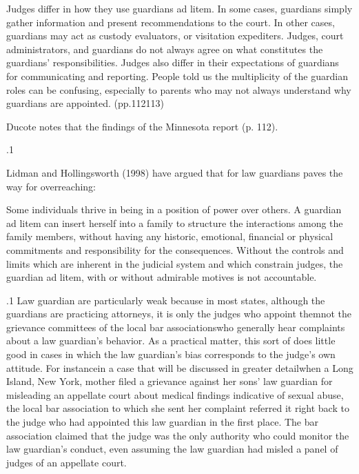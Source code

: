 \documentclass[11pt, twoside]{article}
\begin{document}
{{\begin{blockQuote}
Judges differ in how they use guardians ad litem. In some cases,
guardians simply gather information and present recommendations to the court. In other cases, guardians may act as custody evaluators, or visitation expediters. Judges, court administrators, and guardians do not always agree on what constitutes
the guardians’ responsibilities. Judges also differ in their expectations of guardians for communicating and reporting. People told
us the multiplicity of the guardian roles can be confusing, especially to parents who may not always understand why guardians
are appointed. (pp.\@ 112\ndash{}113)
\end{blockQuote}

\nip{}%
Ducote notes that the findings of the Minnesota report  (p. 112).
}%

\p.1{%
Lidman and Hollingsworth (1998) have argued that  for law guardians paves the way for overreaching:

\begin{blockQuote}
Some individuals thrive in being in a position of power over others. A guardian ad litem can insert herself into a family to structure
the interactions among the family members, without having any
historic, emotional, financial or physical commitments and responsibility for the consequences. Without the controls and limits
which are inherent in the judicial system and which constrain
judges, the guardian ad litem, with or without admirable motives
is not accountable.
\end{blockQuote}

}%

\p.1{%
Law guardian  are particularly weak because in most states,
although the guardians are practicing attorneys, it is only the judges
who appoint them\mdash{}not the grievance committees of the local bar
associa\-tions\mdash{}who generally hear complaints about a law guardian’s behavior. As a practical matter, this sort of  does little good
in cases in which the law guardian’s bias corresponds to the judge’s
own attitude. For instance\mdash{}in a case that will be discussed in greater
detail\mdash{}when a Long Island, New York, mother filed a grievance against
her sons’ law guardian for misleading an appellate court about medical
findings indicative of sexual abuse, the local bar association to which she
sent her complaint referred it right back to the judge who had appointed
this law guardian in the first place. The bar association claimed that the
judge was the only authority who could monitor the law guardian’s conduct, even assuming the law guardian had misled a panel of judges of an
appellate court.
}%


}
\end{document}
